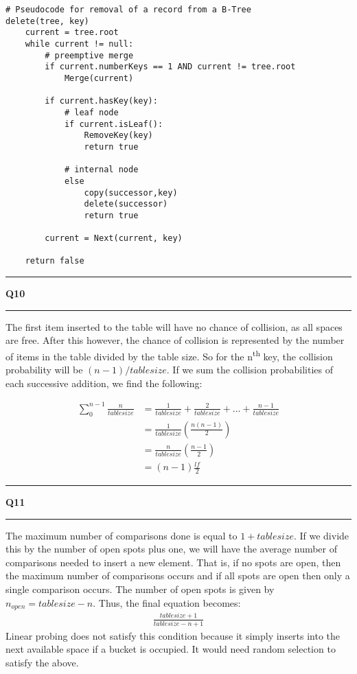 \documentclass[11pt]{article}
\newcommand\question[2]{\vspace{.25in}\hrule\textbf{#1 #2}\vspace{.5em}\hrule\vspace{.10in}}
\begin{document}
\begin{lstlisting}
# Pseudocode for removal of a record from a B-Tree
delete(tree, key)
	current = tree.root
	while current != null:
		# preemptive merge
		if current.numberKeys == 1 AND current != tree.root
			Merge(current)
	
		if current.hasKey(key):
			# leaf node
			if current.isLeaf():
				RemoveKey(key)
				return true
				
			# internal node
			else
				copy(successor,key)
				delete(successor)
				return true
			
		current = Next(current, key)
	
	return false
\end{lstlisting}

\pagebreak
\question{Q10}{}
The first item inserted to the table will have no chance of collision, as all spaces are free. After this however, the chance of collision is represented by the number of items in the table divided by the table size. So for the n\textsuperscript{th} key, the collision probability will be $(n-1)/tablesize$. If we sum the collision probabilities of each successive addition, we find the following:

\begin{align*}
\sum_{0}^{n-1} \frac{n}{tablesize} &= \frac{1}{tablesize} +  \frac{2}{tablesize} + ... + \frac{n-1}{tablesize} \\
&= \frac{1}{tablesize}\left(\frac{n(n-1)}{2}\right) \\
&= \frac{n}{tablesize}\left(\frac{n-1}{2}\right) \\
&= (n-1)\frac{lf}{2}
\end{align*}

\question{Q11}{}
The maximum number of comparisons done is equal to $1+tablesize$. If we divide this by the number of open spots plus one, we will have the average number of comparisons needed to insert a new element. That is, if no spots are open, then the maximum number of comparisons occurs and if all spots are open then only a single comparison occurs. The number of open spots is given by $n_{open} = tablesize - n$. Thus, the final equation becomes:
\begin{align*}
\frac{tablesize+1}{tablesize-n+1}
\end{align*}
Linear probing does not satisfy this condition because it simply inserts into the next available space if a bucket is occupied. It would need random selection to satisfy the above.
\end{document}
